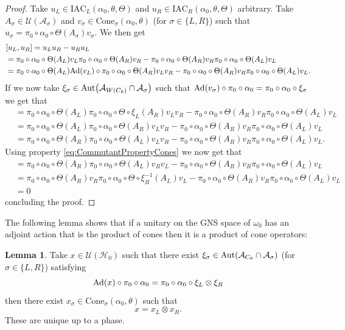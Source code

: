 \documentclass[12pt,a4paper,twoside]{article}
\newcommand{\IAC}{\textrm{IAC}}
\let\originalleft\left
\let\originalright\right
\renewcommand{\left}{\mathopen{}\mathclose\bgroup\originalleft}
\renewcommand{\right}{\aftergroup\egroup\originalright}
\newcommand{\UU}{\mathcal U}
\newcommand{\HH}{\mathcal H}
\renewcommand{\AA}{\mathcal A}
\newcommand{\Ad}[1]{\textrm{Ad}\left(#1\right)}
\newcommand{\Aut}[1]{\textrm{Aut}\left(#1\right)}
\theoremstyle{definition}
\newtheorem{lemma}[theorem]{Lemma}
\numberwithin{equation}{section}
\begin{document}
\begin{proof}
	Take $u_L\in\IAC_L(\alpha_0,\theta,\Theta)$ and $u_R\in\IAC_R(\alpha_0,\theta,\Theta)$ arbitrary. Take $A_\sigma\in\UU(\AA_\sigma)$ and $v_\sigma\in\textrm{Cone}_\sigma(\alpha_0,\theta)$ (for $\sigma\in\{L,R\}$) such that $u_\sigma=\pi_0\circ\alpha_0\circ\Theta(A_\sigma)v_\sigma$. We then get
	\begin{align}
		&[u_L,u_R]=u_Lu_R-u_Ru_L\\
		&=\pi_0\circ\alpha_0\circ\Theta(A_L)v_L\pi_0\circ\alpha_0\circ\Theta(A_R)v_R-\pi_0\circ\alpha_0\circ\Theta(A_R)v_R\pi_0\circ\alpha_0\circ\Theta(A_L)v_L\\
		&=\pi_0\circ\alpha_0\circ\Theta(A_L)\Ad{v_L}\circ\pi_0\circ\alpha_0\circ\Theta(A_R)v_Lv_R-\pi_0\circ\alpha_0\circ\Theta(A_R)v_R\pi_0\circ\alpha_0\circ\Theta(A_L)v_L.
	\end{align}
	If we now take $\xi_\sigma\in\Aut{\AA_{W(C_\theta)}\cap\AA_\sigma}$ such that $\Ad{v_\sigma}\circ\pi_0\circ\alpha_0=\pi_0\circ\alpha_0\circ\xi_\sigma$ we get that
	\begin{align}
		&=\pi_0\circ\alpha_0\circ\Theta(A_L)\pi_0\circ\alpha_0\circ\Theta\circ\xi_L(A_R)v_Lv_R-\pi_0\circ\alpha_0\circ\Theta(A_R)v_R\pi_0\circ\alpha_0\circ\Theta(A_L)v_L\\
		&=\pi_0\circ\alpha_0\circ\Theta(A_L)\pi_0\circ\alpha_0\circ\Theta(A_R)v_Lv_R-\pi_0\circ\alpha_0\circ\Theta(A_R)v_R\pi_0\circ\alpha_0\circ\Theta(A_L)v_L\\
		&=\pi_0\circ\alpha_0\circ\Theta(A_R)\pi_0\circ\alpha_0\circ\Theta(A_L)v_Lv_R-\pi_0\circ\alpha_0\circ\Theta(A_R)v_R\pi_0\circ\alpha_0\circ\Theta(A_L)v_L.
	\end{align}
	Using property \eqref{eq:CommutantPropertyCones} we now get that
	\begin{align}
		&=\pi_0\circ\alpha_0\circ\Theta(A_R)\pi_0\circ\alpha_0\circ\Theta(A_L)v_Rv_L-\pi_0\circ\alpha_0\circ\Theta(A_R)v_R\pi_0\circ\alpha_0\circ\Theta(A_L)v_L\\
		&=\pi_0\circ\alpha_0\circ\Theta(A_R)v_R\pi_0\circ\alpha_0\circ\Theta\circ\xi_R^{-1}(A_L)v_L-\pi_0\circ\alpha_0\circ\Theta(A_R)v_R\pi_0\circ\alpha_0\circ\Theta(A_L)v_L\\
		&=0
	\end{align}
	concluding the proof.
\end{proof}
The following lemma shows that if a unitary on the GNS space of $\omega_0$ has an adjoint action that is the product of cones then it is a product of cone operators:
\begin{lemma}\label{lem:UsingIrreducibilityAndWignerTheorem}
	Take $x\in\UU(\HH_0)$ such that there exist $\xi_\sigma\in\Aut{\AA_{C_\theta}\cap\AA_\sigma}$ (for $\sigma\in\{L,R\}$) satisfying
	\begin{equation}
		\Ad{x}\circ\pi_0\circ\alpha_0=\pi_0\circ\alpha_0\circ\xi_L\otimes\xi_R
	\end{equation}
	then there exist $x_\sigma\in\textrm{Cone}_\sigma(\alpha_0,\theta)$ such that
	\begin{equation}
		x=x_L\otimes x_R.
	\end{equation}
	These are unique up to a phase.
\end{lemma}
\end{document}
